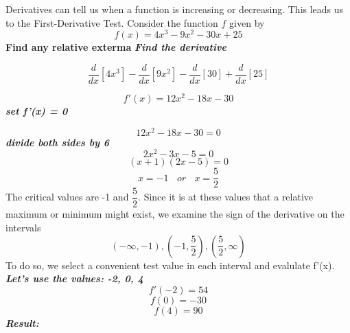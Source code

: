 \documentclass{report}
\begin{document}
\pagebreak
\noindent
Derivatives can tell us when a function is increasing or decreasing. This leads us to the First-Derivative Test.
\q
Consider the function $f$ given by
$$ f(x) = 4x^3 - 9x^2 - 30x + 25$$
\bigbreak \noindent
\textbf{Find any relative exterma}
\bigbreak \noindent
\textit{\textbf{Find the derivative}}

$$ \frac{d}{dx}[4x^3] - \frac{d}{dx}[9x^2] - \frac{d}{dx}[30] + \frac{d}{dx}[25]$$

$$ f'(x) = 12x^2 - 18x -30$$
\textit{\textbf{set f'(x) = 0}}

$$ 12x^2 -18x - 30 = 0$$
\textit{\textbf{divide both sides by 6}}
$$ 2x^2 - 3x -5 = 0$$
$$ (x+1)(2x-5) = 0$$
$$ x = -1 \ \ \ \ or \ \ \ \ x = \dfrac{5}{2}$$
The critical values are -1 and $\dfrac{5}{2}$. Since it is at these values that a relative maximum or minimum might exist, we examine the sign of the derivative on the intervals
$$ (-\infty, -1), (-1,\dfrac{5}{2}), (\dfrac{5}{2}, \infty)$$
To do so, we select a convenient test value in each interval and evalulate f'(x). 
\bigbreak \noindent
\textit{\textbf{Let's use the values: -2, 0, 4}}
$$ f'(-2) = 54$$
$$f(0) = -30$$
$$ f(4) = 90$$
\textit{\textbf{Result:}} \\
\end{document}
